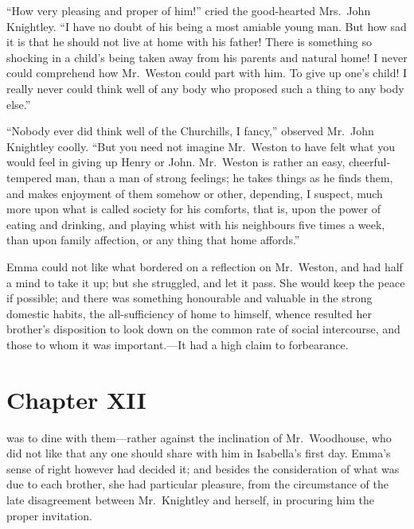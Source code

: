 ``How very pleasing and proper of him!'' cried the good-hearted Mrs.\ John
Knightley.  ``I have no doubt of his being a most amiable young man.
But how sad it is that he should not live at home with his father!
There is something so shocking in a child's being taken away from his
parents and natural home!  I never could comprehend how Mr.\ Weston
could part with him.  To give up one's child!  I really never
could think well of any body who proposed such a thing to any body else.''

``Nobody ever did think well of the Churchills, I fancy,''
observed Mr.\ John Knightley coolly.  ``But you need not imagine
Mr.\ Weston to have felt what you would feel in giving up Henry
or John.  Mr.\ Weston is rather an easy, cheerful-tempered man,
than a man of strong feelings; he takes things as he finds them,
and makes enjoyment of them somehow or other, depending, I suspect,
much more upon what is called society for his comforts, that is,
upon the power of eating and drinking, and playing whist with his
neighbours five times a week, than upon family affection, or any
thing that home affords.''

Emma could not like what bordered on a reflection on Mr.\ Weston,
and had half a mind to take it up; but she struggled, and let
it pass.  She would keep the peace if possible; and there was
something honourable and valuable in the strong domestic habits,
the all-sufficiency of home to himself, whence resulted her brother's
disposition to look down on the common rate of social intercourse,
and those to whom it was important.---It had a high claim to forbearance.



\chapter{Chapter XII}


 was to dine with them---rather against the inclination
of Mr.\ Woodhouse, who did not like that any one should share with him
in Isabella's first day.  Emma's sense of right however had decided it;
and besides the consideration of what was due to each brother,
she had particular pleasure, from the circumstance of the late
disagreement between Mr.\ Knightley and herself, in procuring him
the proper invitation.

